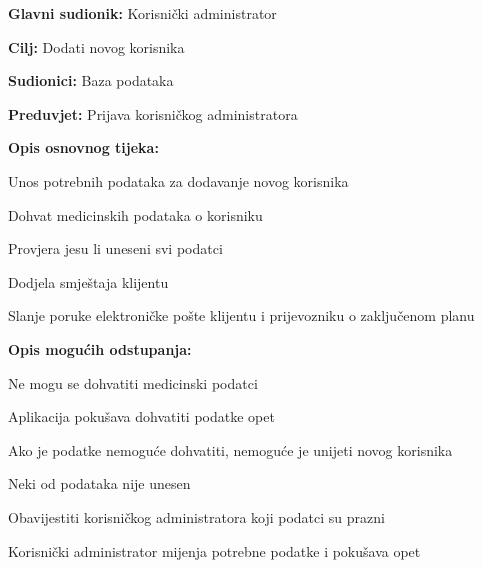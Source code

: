 			\noindent {}
			\begin{packed_item}
				
				\item \textbf{Glavni sudionik: }Korisnički administrator
				\item  \textbf{Cilj:} Dodati novog korisnika
				\item  \textbf{Sudionici:} Baza podataka
				\item  \textbf{Preduvjet:} Prijava korisničkog administratora
				\item  \textbf{Opis osnovnog tijeka:}
				
				\item[] \begin{packed_enum}
					
					\item Unos potrebnih podataka za dodavanje novog korisnika
					\item Dohvat medicinskih podataka o korisniku
					\item Provjera jesu li uneseni svi podatci
					\item Dodjela smještaja klijentu
					\item Slanje poruke elektroničke pošte klijentu i prijevozniku o zaključenom planu 

				\end{packed_enum}
				
				\item  \textbf{Opis mogućih odstupanja:}
				
				\item[] \begin{packed_item}
					
					\item[2.b] Ne mogu se dohvatiti medicinski podatci
					\item[] \begin{packed_enum}
						
						\item Aplikacija pokušava dohvatiti podatke opet
						\item Ako je podatke nemoguće dohvatiti, nemoguće je unijeti novog korisnika
						
					\end{packed_enum}
					
					\item[3.a] Neki od podataka nije unesen
					\item[] \begin{packed_enum}
						
						\item Obavijestiti korisničkog administratora koji podatci su prazni
						\item Korisnički administrator mijenja potrebne podatke i pokušava opet
						
					\end{packed_enum}
					
				\end{packed_item}
			\end{packed_item}
			
